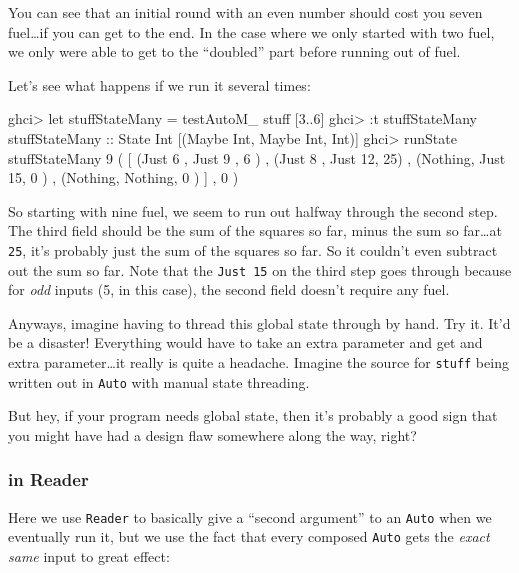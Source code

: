 \documentclass[]{article}
\newenvironment{Shaded}{}{}
\newcommand{\NormalTok}[1]{#1}
\begin{document}
You can see that an initial round with an even number should cost you seven
fuel\ldots if you can get to the end. In the case where we only started with two
fuel, we only were able to get to the ``doubled'' part before running out of
fuel.

Let's see what happens if we run it several times:

\begin{Shaded}
\begin{Highlighting}[]
\NormalTok{ghci\textgreater{} let stuffStateMany = testAutoM\_ stuff [3..6]}
\NormalTok{ghci\textgreater{} :t stuffStateMany}
\NormalTok{stuffStateMany :: State Int [(Maybe Int, Maybe Int, Int)]}
\NormalTok{ghci\textgreater{} runState stuffStateMany 9}
\NormalTok{( [ (Just 6 , Just 9 , 6 )}
\NormalTok{  , (Just 8 , Just 12, 25)}
\NormalTok{  , (Nothing, Just 15, 0 )}
\NormalTok{  , (Nothing, Nothing, 0 ) ]}
\NormalTok{, 0 )}
\end{Highlighting}
\end{Shaded}

So starting with nine fuel, we seem to run out halfway through the second step.
The third field should be the sum of the squares so far, minus the sum so
far\ldots at \texttt{25}, it's probably just the sum of the squares so far. So
it couldn't even subtract out the sum so far. Note that the \texttt{Just\ 15} on
the third step goes through because for \emph{odd} inputs (5, in this case), the
second field doesn't require any fuel.

Anyways, imagine having to thread this global state through by hand. Try it.
It'd be a disaster! Everything would have to take an extra parameter and get and
extra parameter\ldots it really is quite a headache. Imagine the source for
\texttt{stuff} being written out in \texttt{Auto} with manual state threading.

But hey, if your program needs global state, then it's probably a good sign that
you might have had a design flaw somewhere along the way, right?

\subsubsection{in Reader}\label{in-reader}

Here we use \texttt{Reader} to basically give a ``second argument'' to an
\texttt{Auto} when we eventually run it, but we use the fact that every composed
\texttt{Auto} gets the \emph{exact same} input to great effect:
\end{document}
